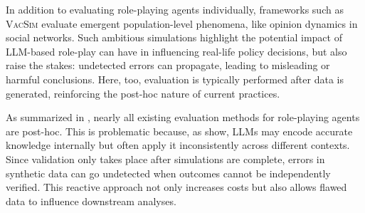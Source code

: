 \documentclass{article} %
\begin{document}
In addition to evaluating role-playing agents individually, frameworks such as \textsc{VacSim} \citep{hou2025can} evaluate emergent population-level phenomena, like opinion dynamics in social networks. Such ambitious simulations highlight the potential impact of LLM-based role-play can have in influencing real-life policy decisions, but also raise the stakes: undetected errors can propagate, leading to misleading or harmful conclusions. Here, too, evaluation is typically performed after data is generated, reinforcing the post-hoc nature of current practices.

As summarized in , nearly all existing evaluation methods for role-playing agents are post-hoc. This is problematic because, as \citet{orgad2024llms} show, LLMs may encode accurate knowledge internally but often apply it inconsistently across different contexts. Since validation only takes place after simulations are complete, errors in synthetic data can go undetected when outcomes cannot be independently verified. This reactive approach not only increases costs but also allows flawed data to influence downstream analyses.




\end{document}
